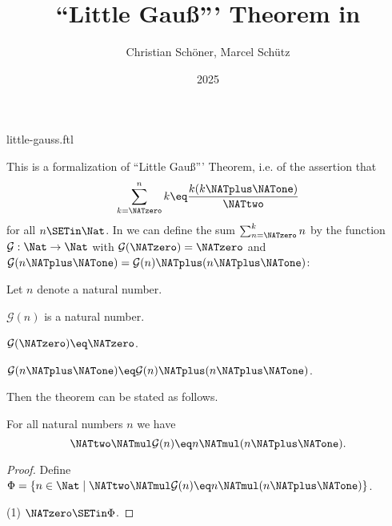 \documentclass{stex}
\title{``Little Gauß''' Theorem in \Naproche}
\author{Christian Schöner, Marcel Schütz}
\date{2025}
\newcommand{\gauss}{\mathcal{G}}
\begin{document}
\begin{smodule}{little-gauss.ftl}
\maketitle


\noindent This is a formalization of ``Little Gauß''' Theorem, i.e. of
the assertion that
\[\sum_{k = \NATzero}^n k \eq \frac{k(k \NATplus \NATone)}\NATtwo\]
for all $n \SETin \Nat$.
In \Naproche we can define the sum $\sum_{n = \NATzero}^k n$ by the function
$\gauss : \Nat \to \Nat$ with $\gauss(\NATzero) = \NATzero$ and
$\gauss(n \NATplus \NATone) = \gauss(n) \NATplus (n \NATplus \NATone)$:

\begin{forthel}
  Let $n$ denote a natural number.

  \begin{signature*}
    $\gauss(n)$ is a natural number.
  \end{signature*}

  \begin{axiom*}
    $\gauss(\NATzero) \eq \NATzero$.
  \end{axiom*}

  \begin{axiom*}
    $\gauss(n \NATplus \NATone) \eq \gauss(n) \NATplus (n \NATplus \NATone)$.
  \end{axiom*}
\end{forthel}

\noindent Then the theorem can be stated as follows.

\begin{forthel}
  \begin{theorem*}[title=Little Gauß,id=little_gauss]
    For all natural numbers $n$ we have
    \[\NATtwo \NATmul \gauss(n) \eq n \NATmul (n \NATplus \NATone).\]
  \end{theorem*}
  \begin{proof}
    Define $\Phi = \{ n \in \Nat \mid \NATtwo \NATmul \gauss(n) \eq n \NATmul (n \NATplus \NATone) \}$.
    
    (1) $\NATzero \SETin \Phi$.


\end{proof}
\end{forthel}
\end{smodule}
\end{document}
